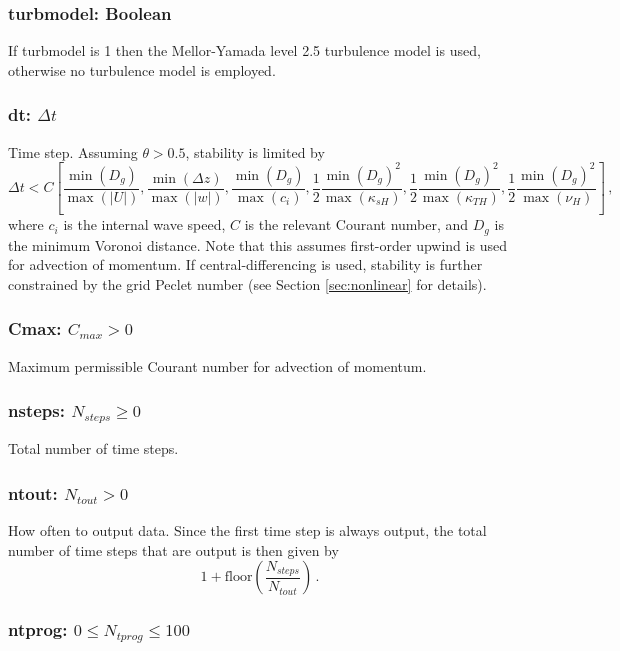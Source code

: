 \subsubsection{turbmodel: Boolean}

If turbmodel is 1 then the Mellor-Yamada level 2.5 turbulence model is used, otherwise
no turbulence model is employed.  

\subsubsection{dt: $\Delta t$} \label{sec:dt}

Time step. Assuming $\theta>0.5$, stability is limited by
\[
\Delta t < C\left[\frac{\min(D_g)}{\max(|U|)},\frac{\min(\Delta z)}{\max(|w|)},
\frac{\min(D_g)}{\max(c_i)},
\frac{1}{2}\frac{\min(D_g)^2}{\max(\kappa_{sH})},
\frac{1}{2}\frac{\min(D_g)^2}{\max(\kappa_{TH})},
\frac{1}{2}\frac{\min(D_g)^2}{\max(\nu_{H})}
\right]\,,
\]
where $c_i$ is the internal wave speed, $C$ is the relevant Courant number, and $D_g$
is the minimum Voronoi distance.  Note that this assumes first-order upwind is used
for advection of momentum.  If central-differencing is used, stability is further
constrained by the grid Peclet number (see Section \ref{sec:nonlinear} for details).

\subsubsection{Cmax: $C_{max}>0$}

Maximum permissible Courant number for advection of momentum.  

\subsubsection{nsteps: $N_{steps}\ge 0$}

Total number of time steps. 


\subsubsection{ntout: $N_{tout}> 0$}

How often to output data.  Since the first time step is always output, 
the total number of time steps that are output is then given
by
\[
1+\mbox{floor}\left(\frac{N_{steps}}{N_{tout}}\right)\,.
\]


\subsubsection{ntprog: $0\le N_{tprog}\le 100$}

